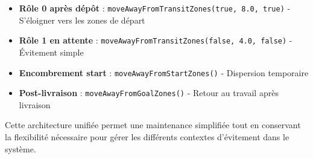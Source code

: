 \documentclass[12pt,a4paper]{article}
\newcommand{\code}[1]{\texttt{#1}}
\begin{document}
\begin{itemize}
    \item \textbf{Rôle 0 après dépôt} : \code{moveAwayFromTransitZones(true, 8.0, true)} - S'éloigner vers les zones de départ
    \item \textbf{Rôle 1 en attente} : \code{moveAwayFromTransitZones(false, 4.0, false)} - Évitement simple
    \item \textbf{Encombrement start} : \code{moveAwayFromStartZones()} - Dispersion temporaire
    \item \textbf{Post-livraison} : \code{moveAwayFromGoalZones()} - Retour au travail après livraison
\end{itemize}

Cette architecture unifiée permet une maintenance simplifiée tout en conservant la flexibilité nécessaire pour gérer les différents contextes d'évitement dans le système.
\end{document}
